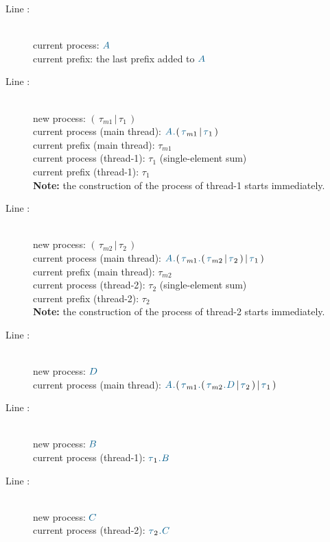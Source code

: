 \begin{description}
	\item[Line :] \hfill \\
	current process: $\procFmt{A}$\\
	current prefix: the last prefix added to $\procFmt{A}$
	
	\item[Line :] \hfill \\
	new process: $(\,\tau_{m1} \,|\, \tau_1\,)$\\
	current process (main thread): $\procFmt{A} \cocoSeq (\,\tau_{m1}\, | \,\tau_1\,)$\\
	current prefix (main thread): $\tau_{m1}$ \\
	current process (thread-1): $\tau_1$ \hspace{30pt}(single-element sum)\\
	current prefix (thread-1): $\tau_1$ \\
	\textbf{Note:} the construction of the process of thread-1 starts immediately.
	
	\item[Line :] \hfill \\
	new process: $(\,\tau_{m2}\, | \,\tau_2\,)$\\
	current process (main thread): $\procFmt{A} \cocoSeq (\,\tau_{m1} \cocoSeq (\,\tau_{m2} \,|\, \tau_2\,) \,| \,\tau_1\,)$\\
	current prefix (main thread): $\tau_{m2}$ \\
	current process (thread-2): $\tau_2$ \hspace{30pt}(single-element sum)\\
	current prefix (thread-2): $\tau_2$ \\
	\textbf{Note:} the construction of the process of thread-2 starts immediately.
	
	\item[Line :] \hfill \\
	new process: $\procFmt{D}$\\
	current process (main thread): $\procFmt{A} \cocoSeq (\,\tau_{m1} \cocoSeq (\,\tau_{m2} \cocoSeq \procFmt{D}  \,|\, \tau_2\,) \,| \,\tau_1\,)$\\
	
	\item[Line :] \hfill \\
	new process: $\procFmt{B}$\\
	current process (thread-1): $\tau_1 \cocoSeq \procFmt{B}$\\
	
	\item[Line :] \hfill \\
	new process: $\procFmt{C}$\\
	current process (thread-2): $\tau_2 \cocoSeq \procFmt{C}$\\
	
\end{description}

